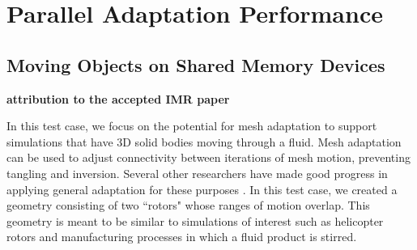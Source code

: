 \section{Parallel Adaptation Performance}

\subsection{Moving Objects on Shared Memory Devices}

{\bf attribution to the accepted IMR paper}

In this test case, we focus on the potential for mesh adaptation to support simulations
that have 3D solid bodies moving through a fluid.
Mesh adaptation can be used to adjust connectivity between iterations of
mesh motion, preventing tangling and inversion.
Several other researchers have made good progress in applying general adaptation
for these purposes
\cite{compere2010mesh,wicke2010dynamic,clausen2013simulating,chen2015parallel}.
In this test case, we created a geometry consisting of two ``rotors" whose ranges of
motion overlap.
This geometry is meant to be similar to simulations of interest such as
helicopter rotors and manufacturing processes in which a fluid product is
stirred.


